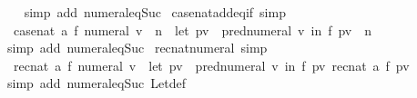 \begin{isabellebody}
%
\isadelimproof
\ \ %
\endisadelimproof
%
\isatagproof
{}\isamarkupfalse%
\ {\isacharparenleft}{\kern0pt}simp\ add{\isacharcolon}{\kern0pt}\ numeral{\isacharunderscore}{\kern0pt}eq{\isacharunderscore}{\kern0pt}Suc{\isacharparenright}{\kern0pt}%
\endisatagproof
{\isafoldproof}%
%
\isadelimproof
\isanewline
%
\endisadelimproof
\isanewline
{}\isamarkupfalse%
\ case{\isacharunderscore}{\kern0pt}nat{\isacharunderscore}{\kern0pt}add{\isacharunderscore}{\kern0pt}eq{\isacharunderscore}{\kern0pt}if\ {\isacharbrackleft}{\kern0pt}simp{\isacharbrackright}{\kern0pt}{\isacharcolon}{\kern0pt}\isanewline
\ \ {\isachardoublequoteopen}case{\isacharunderscore}{\kern0pt}nat\ a\ f\ {\isacharparenleft}{\kern0pt}{\isacharparenleft}{\kern0pt}numeral\ v{\isacharparenright}{\kern0pt}\ {\isacharplus}{\kern0pt}\ n{\isacharparenright}{\kern0pt}\ {\isacharequal}{\kern0pt}\ {\isacharparenleft}{\kern0pt}let\ pv\ {\isacharequal}{\kern0pt}\ pred{\isacharunderscore}{\kern0pt}numeral\ v\ in\ f\ {\isacharparenleft}{\kern0pt}pv\ {\isacharplus}{\kern0pt}\ n{\isacharparenright}{\kern0pt}{\isacharparenright}{\kern0pt}{\isachardoublequoteclose}\isanewline
%
\isadelimproof
\ \ %
\endisadelimproof
%
\isatagproof
{}\isamarkupfalse%
\ {\isacharparenleft}{\kern0pt}simp\ add{\isacharcolon}{\kern0pt}\ numeral{\isacharunderscore}{\kern0pt}eq{\isacharunderscore}{\kern0pt}Suc{\isacharparenright}{\kern0pt}%
\endisatagproof
{\isafoldproof}%
%
\isadelimproof
\isanewline
%
\endisadelimproof
\isanewline
{}\isamarkupfalse%
\ rec{\isacharunderscore}{\kern0pt}nat{\isacharunderscore}{\kern0pt}numeral\ {\isacharbrackleft}{\kern0pt}simp{\isacharbrackright}{\kern0pt}{\isacharcolon}{\kern0pt}\isanewline
\ \ {\isachardoublequoteopen}rec{\isacharunderscore}{\kern0pt}nat\ a\ f\ {\isacharparenleft}{\kern0pt}numeral\ v{\isacharparenright}{\kern0pt}\ {\isacharequal}{\kern0pt}\ {\isacharparenleft}{\kern0pt}let\ pv\ {\isacharequal}{\kern0pt}\ pred{\isacharunderscore}{\kern0pt}numeral\ v\ in\ f\ pv\ {\isacharparenleft}{\kern0pt}rec{\isacharunderscore}{\kern0pt}nat\ a\ f\ pv{\isacharparenright}{\kern0pt}{\isacharparenright}{\kern0pt}{\isachardoublequoteclose}\isanewline
%
\isadelimproof
\ \ %
\endisadelimproof
%
\isatagproof
{}\isamarkupfalse%
\ {\isacharparenleft}{\kern0pt}simp\ add{\isacharcolon}{\kern0pt}\ numeral{\isacharunderscore}{\kern0pt}eq{\isacharunderscore}{\kern0pt}Suc\ Let{\isacharunderscore}{\kern0pt}def{\isacharparenright}{\kern0pt}%
\endisatagproof
{\isafoldproof}%
%
\isadelimproof
\isanewline
%
\endisadelimproof
\isanewline
{}\isamarkupfalse%

\end{isabellebody}
